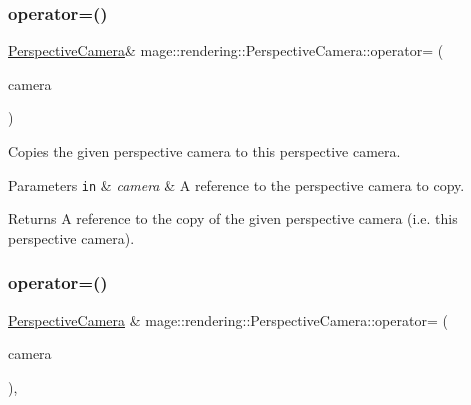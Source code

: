 \hypertarget{classmage_1_1rendering_1_1_perspective_camera_ac9119d544f7ca6c4fbe1a6c5118bcd66}{}\label{classmage_1_1rendering_1_1_perspective_camera_ac9119d544f7ca6c4fbe1a6c5118bcd66} 
\subsubsection{\texorpdfstring{operator=()}{operator=()}\hspace{0.1cm}{\footnotesize\ttfamily [1/2]}}
{\footnotesize\ttfamily \hyperlink{classmage_1_1rendering_1_1_perspective_camera}{Perspective\+Camera}\& mage\+::rendering\+::\+Perspective\+Camera\+::operator= (\begin{DoxyParamCaption}\item[{const \hyperlink{classmage_1_1rendering_1_1_perspective_camera}{Perspective\+Camera} \&}]{camera }\end{DoxyParamCaption})\hspace{0.3cm}{\ttfamily [delete]}}

Copies the given perspective camera to this perspective camera.


\begin{DoxyParams}[1]{Parameters}
\mbox{\tt in}  & {\em camera} & A reference to the perspective camera to copy. \\
\hline
\end{DoxyParams}
\begin{DoxyReturn}{Returns}
A reference to the copy of the given perspective camera (i.\+e. this perspective camera). 
\end{DoxyReturn}
\hypertarget{classmage_1_1rendering_1_1_perspective_camera_ac5b98cb14cd16dffd1a46c4e52ef72a8}{}\label{classmage_1_1rendering_1_1_perspective_camera_ac5b98cb14cd16dffd1a46c4e52ef72a8} 
\subsubsection{\texorpdfstring{operator=()}{operator=()}\hspace{0.1cm}{\footnotesize\ttfamily [2/2]}}
{\footnotesize\ttfamily \hyperlink{classmage_1_1rendering_1_1_perspective_camera}{Perspective\+Camera} \& mage\+::rendering\+::\+Perspective\+Camera\+::operator= (\begin{DoxyParamCaption}\item[{\hyperlink{classmage_1_1rendering_1_1_perspective_camera}{Perspective\+Camera} \&\&}]{camera }\end{DoxyParamCaption})\hspace{0.3cm}{\ttfamily [default]}, {\ttfamily [noexcept]}}


